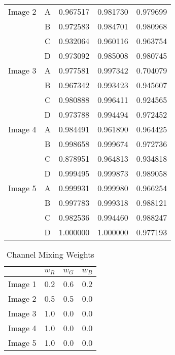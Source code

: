 \begin{definition}
\begin{table}[!h]
\begin{tabular}{|c|c|c|c|c|}
			Image 2     	& A & 0.967517 & 0.981730 & 0.979699 \\
			& B & 0.972583 & 0.984701 & 0.980968 \\
			& C & 0.932064 & 0.960116 & 0.963754 \\
			& D & 0.973092 & 0.985008 & 0.980745 \\ \hline
			
			Image 3     	& A & 0.977581 & 0.997342 & 0.704079 \\
			& B & 0.967342 & 0.993423 & 0.945607 \\
			& C & 0.980888 & 0.996411 & 0.924565 \\
			& D & 0.973788 & 0.994494 & 0.972452 \\ \hline
			
			Image 4     	& A & 0.984491 & 0.961890 & 0.964425 \\
			& B & 0.998658 & 0.999674 & 0.972736 \\
			& C & 0.878951 & 0.964813 & 0.934818 \\
			& D & 0.999495 & 0.999873 & 0.989058 \\ \hline
			
			Image 5    	& A & 0.999931 & 0.999980 & 0.966254 \\
			& B & 0.997783 & 0.999318 & 0.988121 \\
			& C & 0.982536 & 0.994460 & 0.988247 \\
			& D & 1.000000 & 1.000000 & 0.977193 \\ \hline
		\end{tabular}
	\end{table}
	
	\begin{table}[!h]
		\renewcommand{\arraystretch}{1.3}
		\caption{Channel Mixing Weights}
		\label{tab:channel_weights}
		\centering
		\begin{tabular}{|c|c|c|c|}
			\hline
			& $w_R$	& $w_G$	& $w_B$\\ \hline
			Image 1 	& 0.2 	& 0.6 	& 0.2 \\ \hline
			Image 2    	& 0.5 	& 0.5 	& 0.0 \\ \hline
			Image 3		& 1.0 	& 0.0 	& 0.0 \\ \hline
			Image 4		& 1.0 	& 0.0 	& 0.0 \\ \hline
			Image 5		& 1.0 	& 0.0 	& 0.0 \\ \hline
		\end{tabular}
	\end{table}
\end{definition}

